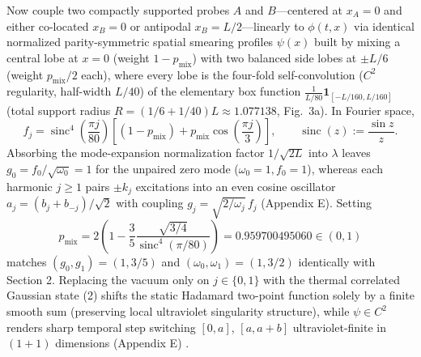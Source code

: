 \documentclass[11pt,letterpaper]{article}
\theoremstyle{definition}
\begin{document}
Now couple two compactly supported probes \(A\) and \(B\)---centered at
\(x_A = 0\) and either co-located \(x_B = 0\) or antipodal
\(x_B = L/2\)---linearly to \(\phi(t, x)\) via identical normalized
parity-symmetric spatial smearing profiles \(\psi(x)\) built by mixing a
central lobe at \(x = 0\) (weight \(1 - p_{\mathrm{mix}}\)) with two
balanced side lobes at \(\pm L/6\) (weight \(p_{\mathrm{mix}}/2\) each),
where every lobe is the four-fold self-convolution (\(C^2\) regularity,
half-width \(L/40\)) of the elementary box function
\(\frac{1}{L/80}\mathbf{1}_{[-L/160, L/160]}\) (total support radius
\(R = (1/6 + 1/40)L \approx 1.077138\), Fig.~3a). In Fourier space,
\[f_j = \operatorname{sinc}^4\!\left(\frac{\pi j}{80}\right)\left[(1 - p_{\mathrm{mix}}) + p_{\mathrm{mix}}\cos\!\left(\frac{\pi j}{3}\right)\right], \qquad \operatorname{sinc}(z) := \frac{\sin z}{z}.
\tag{27}\] Absorbing the mode-expansion normalization factor
\(1/\sqrt{2L}\) into \(\lambda\) leaves
\(g_0 = f_0/\sqrt{\omega_0} = 1\) for the unpaired zero mode
(\(\omega_0 = 1, f_0 = 1\)), whereas each harmonic \(j \ge 1\) pairs
\(\pm k_j\) excitations into an even cosine oscillator
\(a_j = (b_j + b_{-j})/\sqrt{2}\) with coupling
\(g_j = \sqrt{2/\omega_j}\,f_j\) (Appendix E). Setting
\[p_{\mathrm{mix}} = 2\left(1 - \frac{3}{5}\frac{\sqrt{3/4}}{\operatorname{sinc}^4(\pi/80)}\right) = 0.959700495060 \in (0, 1)
\tag{28}\] matches \((g_0, g_1) = (1, 3/5)\) and
\((\omega_0, \omega_1) = (1, 3/2)\) identically with Section 2.
Replacing the vacuum only on \(j \in \{0, 1\}\) with the thermal
correlated Gaussian state (2) shifts the static Hadamard two-point
function solely by a finite smooth sum (preserving local ultraviolet
singularity structure), while \(\psi \in C^2\) renders sharp temporal
step switching \([0, a]\), \([a, a+b]\) ultraviolet-finite in \((1+1)\)
dimensions (Appendix E) \citep{martinMartinez2015}.
\end{document}
